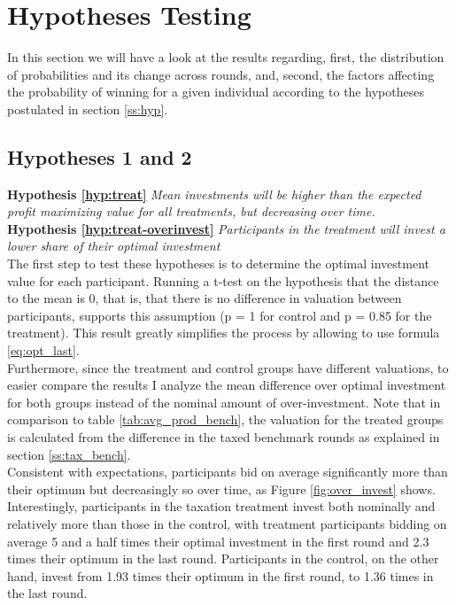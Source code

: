 \section{Hypotheses Testing}

In this section we will have a look at the results regarding, first, the distribution of probabilities and its change across rounds, and, second, the factors affecting the probability of winning for a given individual according to the hypotheses postulated in section \ref{ss:hyp}.


\subsection{Hypotheses 1 and 2}

\textbf{Hypothesis \ref{hyp:treat}} \textit{Mean investments will be higher than the expected profit maximizing value for all treatments, but decreasing over time.}\\ 
\textbf{Hypothesis \ref{hyp:treat-overinvest}} \textit{Participants in the treatment will invest a lower share of their optimal investment}\\

The first step to test these hypotheses is to determine the optimal investment value for each participant. Running a t-test on the hypothesis that the distance to the mean is 0, that is, that there is no difference in valuation between participants, supports this assumption (p = 1 for control and p = 0.85 for the treatment). This result greatly simplifies the process by allowing to use formula \ref{eq:opt_last}.\\

Furthermore, since the treatment and control groups have different valuations, to easier compare the results I analyze the mean difference over optimal investment for both groups instead of the nominal amount of over-investment. Note that in comparison to table \ref{tab:avg_prod_bench}, the valuation for the treated groups is calculated from the difference in the taxed benchmark rounds as explained in section \ref{ss:tax_bench}.\\

Consistent with expectations, participants bid on average significantly more than their optimum but decreasingly so over time, as Figure \ref{fig:over_invest} shows. Interestingly, participants in the taxation treatment invest both nominally and relatively more than those in the control, with treatment participants bidding on average 5 and a half times their optimal investment in the first round and 2.3 times their optimum in the last round. Participants in the control, on the other hand, invest from 1.93 times their optimum in the first round, to 1.36 times in the last round.\\


